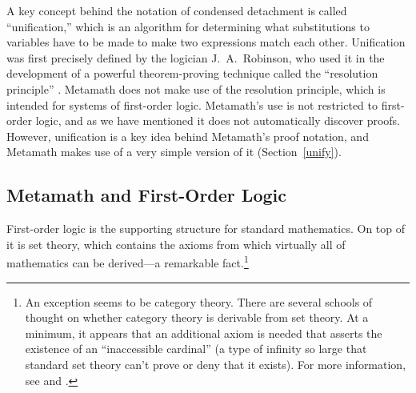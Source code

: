 A key concept behind the notation of condensed detachment is called
``unification,'' which is an algorithm for determining what
substitutions to
variables have to be made to make two expressions match each other.
Unification was first precisely defined by the logician J.~A.~Robinson, who
used it in the development of a powerful
theorem-proving technique called the ``resolution principle''
\cite{Robinson}. Metamath does not make
use of the resolution principle, which is intended for systems of first-order
logic.  Metamath's use is not restricted to
first-order logic, and as we have mentioned it does not automatically discover
proofs.  However, unification is a key idea behind Metamath's proof
notation, and Metamath makes use of a very simple version of it
(Section~\ref{unify}).

\subsection{Metamath and First-Order Logic}

First-order logic is the supporting structure
for standard mathematics.  On top of it is set theory, which contains
the axioms from which virtually all of mathematics can be derived---a
remarkable fact.\label{categoryth}\footnote{An exception seems
to be category theory.  There are several schools of thought on whether
category theory is derivable from set theory.  At a minimum, it appears
that an additional axiom is needed that asserts the existence of an
``inaccessible cardinal'' (a type of infinity so large that standard set
theory can't prove or deny that it exists).
%
%
For more information, see
\cite[pp.~328--331]{Herrlich} and
\cite{Blass}.}

